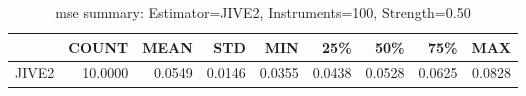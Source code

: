 \begin{table}[ht]
\centering
\caption{mse summary: Estimator=JIVE2, Instruments=100, Strength=0.50}
\begin{tabular}{lrrrrrrrr}
\toprule
 & COUNT & MEAN & STD & MIN & 25\% & 50\% & 75\% & MAX \\
\midrule
JIVE2 & 10.0000 & 0.0549 & 0.0146 & 0.0355 & 0.0438 & 0.0528 & 0.0625 & 0.0828 \\
\bottomrule
\end{tabular}
\end{table}
